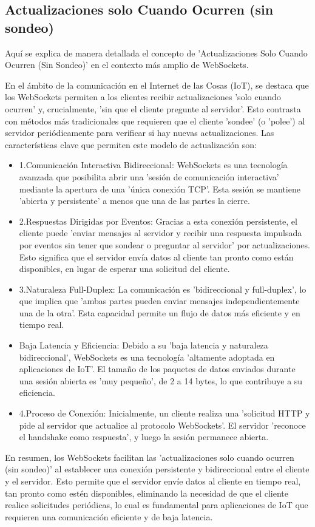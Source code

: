 \documentclass{report}
\begin{document}
\subsection{Actualizaciones solo Cuando Ocurren (sin sondeo)}
Aquí se explica de manera detallada el concepto de 'Actualizaciones Solo Cuando Ocurren (Sin Sondeo)'  
en el contexto más amplio de WebSockets.

En el ámbito de la comunicación en el Internet de las Cosas (IoT), se destaca que los  WebSockets  permiten a los 
clientes recibir actualizaciones 'solo cuando ocurren' y, crucialmente, 'sin que el cliente pregunte al servidor'. Esto 
contrasta con métodos más tradicionales que requieren que el cliente 'sondee' (o 'polee') al servidor periódicamente 
para verificar si hay nuevas actualizaciones.
Las características clave que permiten este modelo de actualización son:
\begin{itemize}
    \item 1.Comunicación Interactiva Bidireccional: WebSockets es una tecnología avanzada que posibilita abrir una 'sesión de 
    comunicación interactiva' mediante la apertura de una 'única conexión TCP'. Esta sesión se mantiene 'abierta y persistente' 
    a menos que una de las partes la cierre.
    \item 2.Respuestas Dirigidas por Eventos: Gracias a esta conexión persistente, el cliente puede 'enviar mensajes al servidor 
    y recibir una respuesta impulsada por eventos sin tener que sondear o preguntar al servidor' por actualizaciones. Esto 
    significa que el servidor envía datos al cliente tan pronto como están disponibles, en lugar de esperar una solicitud del cliente.
    \item 3.Naturaleza Full-Duplex: La comunicación es 'bidireccional y full-duplex', lo que implica que 'ambas partes pueden 
    enviar mensajes independientemente una de la otra'. Esta capacidad permite un flujo de datos más eficiente y en tiempo real.
    \item Baja Latencia y Eficiencia: Debido a su 'baja latencia y naturaleza bidireccional', WebSockets es una tecnología 
    'altamente adoptada en aplicaciones de IoT'. El tamaño de los paquetes de datos enviados durante una sesión abierta es 
    'muy pequeño', de 2 a 14 bytes, lo que contribuye a su eficiencia.
    \item 4.Proceso de Conexión: Inicialmente, un cliente realiza una 'solicitud HTTP y pide al servidor que actualice al protocolo 
    WebSockets'. El servidor 'reconoce el handshake como respuesta', y luego la sesión permanece abierta.
\end{itemize}
En resumen, los  WebSockets  facilitan las 'actualizaciones solo cuando ocurren (sin sondeo)'  al establecer una conexión 
persistente y bidireccional entre el cliente y el servidor. Esto permite que el servidor envíe datos al cliente en tiempo real, 
tan pronto como estén disponibles, eliminando la necesidad de que el cliente realice solicitudes periódicas, lo cual es 
fundamental para aplicaciones de IoT que requieren una comunicación eficiente y de baja latencia.
\end{document}
